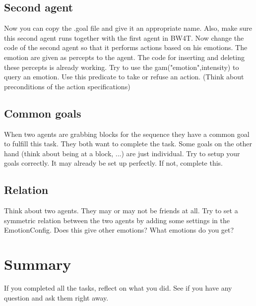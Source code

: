 \documentclass{scrartcl}
\begin{document}
\subsection{Second agent}
Now you can copy the .goal file and give it an appropriate name. Also, make sure this second agent runs together with the first agent in BW4T. Now change the code of the second agent so that it performs actions based on his emotions. The emotion are given as percepts to the agent. The code for inserting and deleting these percepts is already working. Try to use the gam("emotion",intensity) to query an emotion. Use this predicate to take or refuse an action. (Think about preconditions of the action specifications)

\subsection{Common goals}
When two agents are grabbing blocks for the sequence they have a common goal to fulfill this task. They both want to complete the task. Some goals on the other hand (think about being at a block, ...) are just individual. Try to setup your goals correctly. It may already be set up perfectly. If not, complete this.

\subsection{Relation}
Think about two agents. They may or may not be friends at all. Try to set a symmetric relation between the two agents by adding some settings in the EmotionConfig. Does this give other emotions? What emotions do you get?



\section{Summary}
If you completed all the tasks, reflect on what you did.
See if you have any question and ask them right away. 
\end{document}
